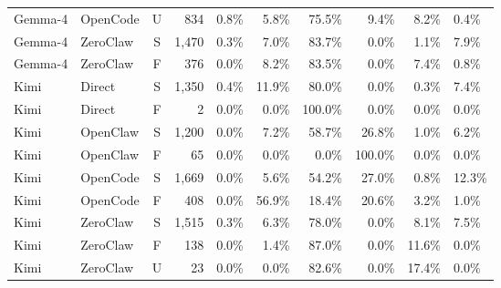 \begin{table}[t]
\begin{tabular}{@{}llcrrrrrr@{}}
  Gemma-4 & OpenCode & U & 834 & 0.8\% & 5.8\% & 75.5\% & 9.4\% & 8.2\% & 0.4\% \\
  Gemma-4 & ZeroClaw & S & 1,470 & 0.3\% & 7.0\% & 83.7\% & 0.0\% & 1.1\% & 7.9\% \\
  Gemma-4 & ZeroClaw & F & 376 & 0.0\% & 8.2\% & 83.5\% & 0.0\% & 7.4\% & 0.8\% \\
\midrule
  Kimi & Direct & S & 1,350 & 0.4\% & 11.9\% & 80.0\% & 0.0\% & 0.3\% & 7.4\% \\
  Kimi & Direct & F & 2 & 0.0\% & 0.0\% & 100.0\% & 0.0\% & 0.0\% & 0.0\% \\
  Kimi & OpenClaw & S & 1,200 & 0.0\% & 7.2\% & 58.7\% & 26.8\% & 1.0\% & 6.2\% \\
  Kimi & OpenClaw & F & 65 & 0.0\% & 0.0\% & 0.0\% & 100.0\% & 0.0\% & 0.0\% \\
  Kimi & OpenCode & S & 1,669 & 0.0\% & 5.6\% & 54.2\% & 27.0\% & 0.8\% & 12.3\% \\
  Kimi & OpenCode & F & 408 & 0.0\% & 56.9\% & 18.4\% & 20.6\% & 3.2\% & 1.0\% \\
  Kimi & ZeroClaw & S & 1,515 & 0.3\% & 6.3\% & 78.0\% & 0.0\% & 8.1\% & 7.5\% \\
  Kimi & ZeroClaw & F & 138 & 0.0\% & 1.4\% & 87.0\% & 0.0\% & 11.6\% & 0.0\% \\
  Kimi & ZeroClaw & U & 23 & 0.0\% & 0.0\% & 82.6\% & 0.0\% & 17.4\% & 0.0\% \\
\bottomrule
\end{tabular}
\vspace{-14pt}
\end{table}


